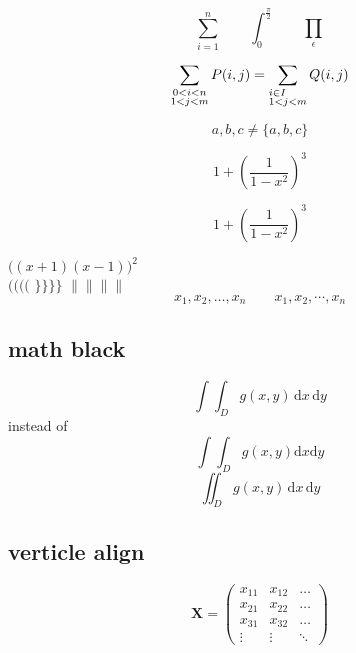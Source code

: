 \documentclass[a4paper, 11pt]{article}
\begin{document}
\begin{displaymath}
\sum_{i=1}^{n}\qquad \int_{0}^{\frac{\pi}{2}}\qquad \prod_{\epsilon}
\end{displaymath}

\begin{displaymath}
\sum_{\substack{0<i<n \\ 1<j<m}}P(i,j) = \sum_{\begin{subarray}{l}
i \in I \\ 1<j<m
\end{subarray}}Q(i,j)
\end{displaymath}

\begin{displaymath}
{a,b,c} \neq \{a, b, c\}
\end{displaymath}

\begin{displaymath}
1 + \left(\frac{1}{1- x^2}\right)^3
\end{displaymath}

\begin{displaymath}
1 + (\frac{1}{1- x^2})^3
\end{displaymath}

$\big((x+1)(x-1)\big)^2$\\
$\big(\Big(\bigg(\Bigg($ \quad $\big\}\Big\}\bigg\}\Bigg\}$
\quad
$\big\| \Big\| \bigg\| \Bigg\|$\\

\begin{displaymath}
x_1, x_2, \ldots, x_n \qquad
x_1, x_2, \cdots, x_n
\end{displaymath}

\subsection{math black}
\newcommand{\ud}{\mathrm{d}}
\begin{displaymath}
\int\!\!\!\int_{D}g(x,y)\,\ud x\, \ud y
\end{displaymath}
instead of
\begin{displaymath}
\int\int_{D} g(x,y)\ud x\ud y
\end{displaymath}
\begin{displaymath}
\iint_{D} g(x,y) \, \ud x\, \ud y
\end{displaymath}

\subsection{verticle align}
\begin{displaymath}
\mathbf{X} = 
\left(\begin{array}{ccc}
x_{11} & x_{12} & \ldots\\
x_{21} & x_{22} & \ldots\\
x_{31} & x_{32} & \ldots\\
\vdots & \vdots & \ddots
\end{array}\right)
\end{displaymath}
\end{document}
